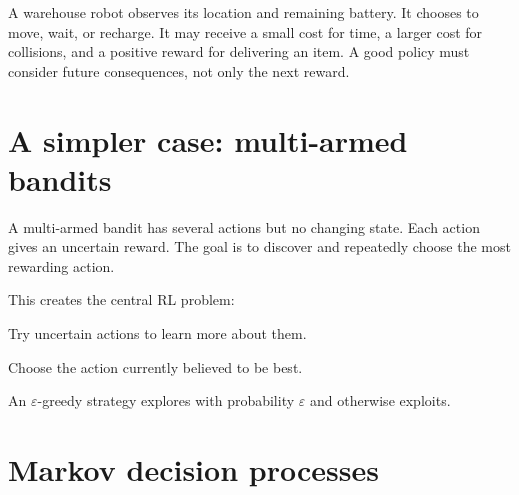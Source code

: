 \begin{mlfigure}
\end{mlfigure}

\begin{workedexample}
A warehouse robot observes its location and remaining battery. It chooses to move, wait, or recharge. It may receive a small cost for time, a larger cost for collisions, and a positive reward for delivering an item. A good policy must consider future consequences, not only the next reward.
\end{workedexample}

\section{A simpler case: multi-armed bandits}

A multi-armed bandit has several actions but no changing state. Each action gives an uncertain reward. The goal is to discover and repeatedly choose the most rewarding action.

This creates the central RL problem:

\begin{description}[leftmargin=1.35in,style=nextline]
  \item[Exploration] Try uncertain actions to learn more about them.
  \item[Exploitation] Choose the action currently believed to be best.
\end{description}

An $\varepsilon$-greedy strategy explores with probability $\varepsilon$ and otherwise exploits.

\section{Markov decision processes}

